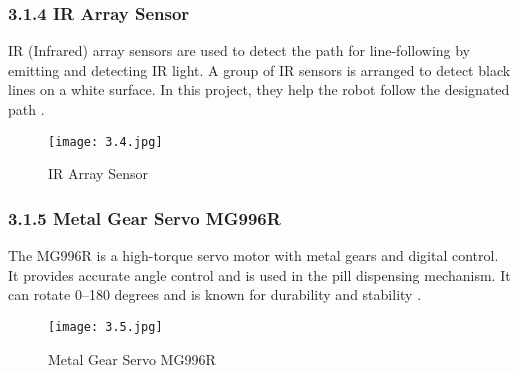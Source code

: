 \subsubsection*{3.1.4 IR Array Sensor}
IR (Infrared) array sensors are used to detect the path for line-following by emitting and detecting IR light. A group of IR sensors is arranged to detect black lines on a white surface. In this project, they help the robot follow the designated path .

\begin{figure}[H]
    \centering
    \texttt{[image: 3.4.jpg]}
    \caption{IR Array Sensor}
    \label{fig:3.4}\cite{10}
\end{figure}

\subsubsection*{3.1.5 Metal Gear Servo MG996R}
The MG996R is a high-torque servo motor with metal gears and digital control. It provides accurate angle control and is used in the pill dispensing mechanism. It can rotate 0–180 degrees and is known for durability and stability .

\begin{figure}[H]
    \centering
    \texttt{[image: 3.5.jpg]}
    \caption{Metal Gear Servo MG996R}
    \label{fig:3.5}\cite{11}
\end{figure}
